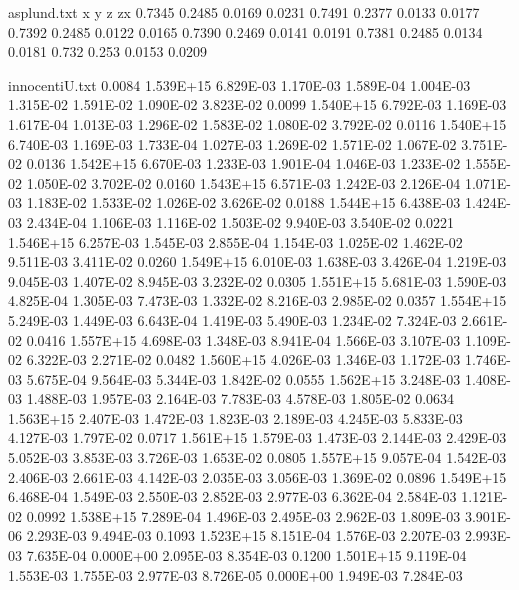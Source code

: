 \begin{filecontents}{asplund.txt}%
x y z zx%
0.7345 0.2485 0.0169 0.0231%
0.7491 0.2377 0.0133 0.0177%
0.7392 0.2485 0.0122 0.0165%
0.7390 0.2469 0.0141 0.0191%
0.7381 0.2485 0.0134 0.0181%
0.732 0.253 0.0153 0.0209
\end{filecontents}

\begin{filecontents}{innocentiU.txt}
0.0084 1.539E+15 6.829E-03 1.170E-03 1.589E-04 1.004E-03 1.315E-02 1.591E-02 1.090E-02 3.823E-02
0.0099 1.540E+15 6.792E-03 1.169E-03 1.617E-04 1.013E-03 1.296E-02 1.583E-02 1.080E-02 3.792E-02
0.0116 1.540E+15 6.740E-03 1.169E-03 1.733E-04 1.027E-03 1.269E-02 1.571E-02 1.067E-02 3.751E-02
0.0136 1.542E+15 6.670E-03 1.233E-03 1.901E-04 1.046E-03 1.233E-02 1.555E-02 1.050E-02 3.702E-02
0.0160 1.543E+15 6.571E-03 1.242E-03 2.126E-04 1.071E-03 1.183E-02 1.533E-02 1.026E-02 3.626E-02
0.0188 1.544E+15 6.438E-03 1.424E-03 2.434E-04 1.106E-03 1.116E-02 1.503E-02 9.940E-03 3.540E-02
0.0221 1.546E+15 6.257E-03 1.545E-03 2.855E-04 1.154E-03 1.025E-02 1.462E-02 9.511E-03 3.411E-02
0.0260 1.549E+15 6.010E-03 1.638E-03 3.426E-04 1.219E-03 9.045E-03 1.407E-02 8.945E-03 3.232E-02
0.0305 1.551E+15 5.681E-03 1.590E-03 4.825E-04 1.305E-03 7.473E-03 1.332E-02 8.216E-03 2.985E-02
0.0357 1.554E+15 5.249E-03 1.449E-03 6.643E-04 1.419E-03 5.490E-03 1.234E-02 7.324E-03 2.661E-02
0.0416 1.557E+15 4.698E-03 1.348E-03 8.941E-04 1.566E-03 3.107E-03 1.109E-02 6.322E-03 2.271E-02
0.0482 1.560E+15 4.026E-03 1.346E-03 1.172E-03 1.746E-03 5.675E-04 9.564E-03 5.344E-03 1.842E-02
0.0555 1.562E+15 3.248E-03 1.408E-03 1.488E-03 1.957E-03 2.164E-03 7.783E-03 4.578E-03 1.805E-02
0.0634 1.563E+15 2.407E-03 1.472E-03 1.823E-03 2.189E-03 4.245E-03 5.833E-03 4.127E-03 1.797E-02
0.0717 1.561E+15 1.579E-03 1.473E-03 2.144E-03 2.429E-03 5.052E-03 3.853E-03 3.726E-03 1.653E-02
0.0805 1.557E+15 9.057E-04 1.542E-03 2.406E-03 2.661E-03 4.142E-03 2.035E-03 3.056E-03 1.369E-02
0.0896 1.549E+15 6.468E-04 1.549E-03 2.550E-03 2.852E-03 2.977E-03 6.362E-04 2.584E-03 1.121E-02
0.0992 1.538E+15 7.289E-04 1.496E-03 2.495E-03 2.962E-03 1.809E-03 3.901E-06 2.293E-03 9.494E-03
0.1093 1.523E+15 8.151E-04 1.576E-03 2.207E-03 2.993E-03 7.635E-04 0.000E+00 2.095E-03 8.354E-03
0.1200 1.501E+15 9.119E-04 1.553E-03 1.755E-03 2.977E-03 8.726E-05 0.000E+00 1.949E-03 7.284E-03

\end{filecontents}
